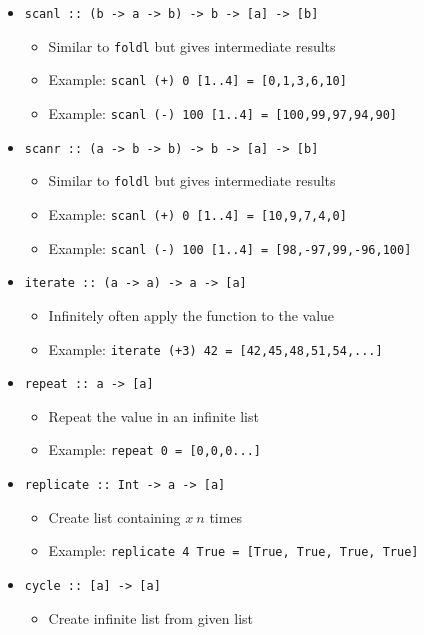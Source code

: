 \begin{itemize}
\begin{itemize}
        \end{itemize}
    \item \verb+scanl :: (b -> a -> b) -> b -> [a] -> [b]+
        \begin{itemize}
            \item Similar to \verb+foldl+ but gives intermediate results
            \item Example: \verb|scanl (+) 0 [1..4] = [0,1,3,6,10]|
            \item Example: \verb|scanl (-) 100 [1..4] = [100,99,97,94,90]|
        \end{itemize}
    \item \verb+scanr :: (a -> b -> b) -> b -> [a] -> [b]+
        \begin{itemize}
            \item Similar to \verb+foldl+ but gives intermediate results
            \item Example: \verb|scanl (+) 0 [1..4] = [10,9,7,4,0]|
            \item Example: \verb|scanl (-) 100 [1..4] = [98,-97,99,-96,100]|
        \end{itemize}
    \item \verb+iterate :: (a -> a) -> a -> [a]+
        \begin{itemize}
            \item Infinitely often apply the function to the value
            \item Example: \verb|iterate (+3) 42 = [42,45,48,51,54,...]|
        \end{itemize}
    \item \verb+repeat :: a -> [a]+
        \begin{itemize}
            \item Repeat the value in an infinite list
            \item Example: \verb+repeat 0 = [0,0,0...]+
        \end{itemize}
    \item \verb+replicate :: Int -> a -> [a]+
        \begin{itemize}
            \item Create list containing $x \ n$ times
            \item Example: \verb+replicate 4 True = [True, True, True, True]+
        \end{itemize}
    \item \verb+cycle :: [a] -> [a]+
        \begin{itemize}
            \item Create infinite list from given list

\end{itemize}
\end{itemize}
